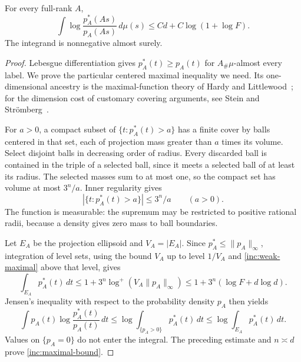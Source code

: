 \begin{lemma}\label{inc:maximal}
For every full-rank \(A\),
\begin{equation}\label{inc:maximal-bound}
 \int\log\frac{p_A^*(As)}{p_A(As)}\,d\mu(s)
 \le Cd+C\log(1+\log F).
\end{equation}
The integrand is nonnegative almost surely.
\end{lemma}

\begin{proof}
Lebesgue differentiation gives \(p_A^*(t)\ge p_A(t)\) for
\(A_\#\mu\)-almost every label.  We prove the particular
centered maximal inequality we need.  Its one-dimensional ancestry is
the maximal-function theory of Hardy and
Littlewood~\cite[Section~III]{HardyLittlewood1930}; for the dimension
cost of customary covering arguments, see Stein and
Str\"omberg~\cite[p.~259]{SteinStromberg1983}.

For \(a>0\), a compact subset of \(\{t:p_A^*(t)>a\}\) has a finite
cover by balls centered in that set, each of projection mass greater
than \(a\) times its volume.  Select disjoint balls in decreasing order
of radius.  Every discarded ball is contained in the triple of a
selected ball, since it meets a selected ball of at least its radius.
The selected masses sum to at most one, so the compact set has volume
at most \(3^n/a\).  Inner regularity gives
\begin{equation}\label{inc:weak-maximal}
 |\{t:p_A^*(t)>a\}|\le3^n/a\qquad(a>0).
\end{equation}
The function is measurable: the supremum may be restricted to positive
rational radii, because a density gives zero mass to ball boundaries.

Let \(E_A\) be the projection ellipsoid and \(V_A=|E_A|\).
Since \(p_A^*\le\|p_A\|_\infty\), integration of level sets, using
the bound \(V_A\) up to level \(1/V_A\) and
\eqref{inc:weak-maximal} above that level, gives
\[
 \int_{E_A}p_A^*(t)\,dt
 \le1+3^n\log^+(V_A\|p_A\|_\infty)
 \le1+3^n(\log F+d\log d).
\]
Jensen's inequality with respect to the probability density \(p_A\)
then yields
\[
 \int p_A(t)\log\frac{p_A^*(t)}{p_A(t)}\,dt
 \le\log\int_{\{p_A>0\}}p_A^*(t)\,dt
 \le\log\int_{E_A}p_A^*(t)\,dt.
\]
Values on \(\{p_A=0\}\) do not enter the integral.  The preceding
estimate and \(n\asymp d\) prove \eqref{inc:maximal-bound}.
\end{proof}

